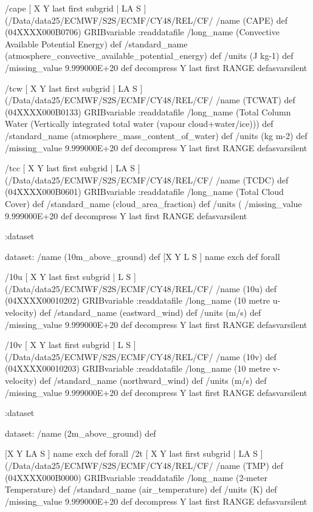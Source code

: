 \begin{ingrid}
/cape { [ X Y last first subgrid | LA S ] (/Data/data25/ECMWF/S2S/ECMF/CY48/REL/CF/%
/name (CAPE) def
(04XXXX000B0706) GRIBvariable
:readdatafile
/long_name (Convective Available Potential Energy) def
/standard_name (atmosphere_convective_available_potential_energy) def
/units (J kg-1) def
/missing_value 9.999000E+20 def
decompress
Y last first RANGE
} defasvarsilent

/tcw { [ X Y last first subgrid | LA S ] (/Data/data25/ECMWF/S2S/ECMF/CY48/REL/CF/%
/name (TCWAT) def
(04XXXX000B0133) GRIBvariable
:readdatafile
/long_name (Total Column Water (Vertically integrated total water (vapour cloud+water/ice))) def
/standard_name (atmosphere_mass_content_of_water) def
/units (kg m-2) def
/missing_value 9.999000E+20 def
decompress
Y last first RANGE
} defasvarsilent

/tcc { [ X Y last first subgrid | LA S ] (/Data/data25/ECMWF/S2S/ECMF/CY48/REL/CF/%
/name (TCDC) def
(04XXXX000B0601) GRIBvariable
:readdatafile
/long_name (Total Cloud Cover) def
/standard_name (cloud_area_fraction) def
/units (%
/missing_value 9.999000E+20 def
decompress
Y last first RANGE
} defasvarsilent

:dataset

dataset:
/name (10m_above_ground) def
[X Y L S ] {name exch def } forall

/10u { [ X Y last first subgrid | L S ] (/Data/data25/ECMWF/S2S/ECMF/CY48/REL/CF/%
/name (10u) def
(04XXXX00010202) GRIBvariable
:readdatafile
/long_name (10 metre u-velocity) def
/standard_name (eastward_wind) def
/units (m/s) def
/missing_value 9.999000E+20 def
decompress
Y last first RANGE
} defasvarsilent

/10v { [ X Y last first subgrid | L S ] (/Data/data25/ECMWF/S2S/ECMF/CY48/REL/CF/%
/name (10v) def
(04XXXX00010203) GRIBvariable
:readdatafile
/long_name (10 metre v-velocity) def
/standard_name (northward_wind) def
/units (m/s) def
/missing_value 9.999000E+20 def
decompress
Y last first RANGE
} defasvarsilent

:dataset

dataset:
/name (2m_above_ground) def

[X Y LA S ] {name exch def } forall
/2t { [ X Y last first subgrid | LA S ] (/Data/data25/ECMWF/S2S/ECMF/CY48/REL/CF/%
/name (TMP) def
(04XXXX000B0000) GRIBvariable
:readdatafile
/long_name (2-meter Temperature) def
/standard_name (air_temperature) def
/units (K) def
/missing_value 9.999000E+20 def
decompress
Y last first RANGE
} defasvarsilent


\end{ingrid}
